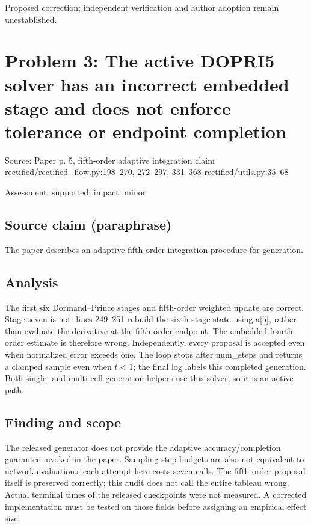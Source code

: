 \documentclass[11pt]{article}
\begin{document}
Proposed correction; independent verification and author adoption remain unestablished.

\section*{Problem 3: The active DOPRI5 solver has an incorrect embedded stage and does not enforce tolerance or endpoint completion}

Source: Paper p. 5, fifth-order adaptive integration claim rectified/rectified\_flow.py:198–270, 272–297, 331–368 rectified/utils.py:35–68

Assessment: supported; impact: minor

\subsection*{Source claim (paraphrase)}

The paper describes an adaptive fifth-order integration procedure for generation.

\subsection*{Analysis}

The first six Dormand–Prince stages and fifth-order weighted update are correct. Stage seven is not: lines 249–251 rebuild the sixth-stage state using a[\(5\)], rather than evaluate the derivative at the fifth-order endpoint. The embedded fourth-order estimate is therefore wrong. Independently, every proposal is accepted even when normalized error exceeds one. The loop stops after num\_steps and returns a clamped sample even when \(t<1\); the final log labels this completed generation. Both single- and multi-cell generation helpers use this solver, so it is an active path.

\subsection*{Finding and scope}

The released generator does not provide the adaptive accuracy/completion guarantee invoked in the paper. Sampling-step budgets are also not equivalent to network evaluations: each attempt here costs seven calls. The fifth-order proposal itself is preserved correctly; this audit does not call the entire tableau wrong. Actual terminal times of the released checkpoints were not measured. A corrected implementation must be tested on those fields before assigning an empirical effect size.
\end{document}
